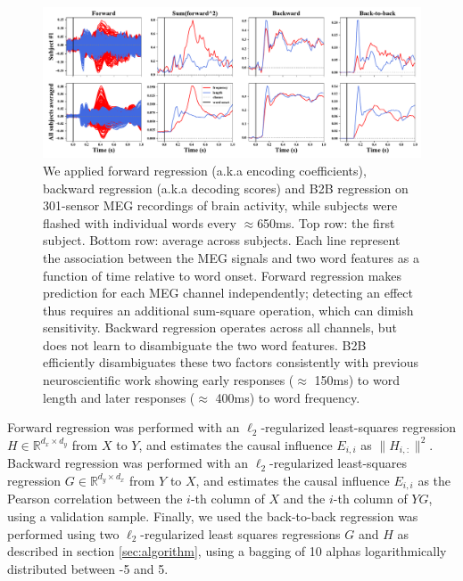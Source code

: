 \begin{figure}[t!]
  \centering
  \includegraphics[width=\textwidth, trim=0cm 0cm 0cm 0cm, clip=True]{figures/meg_twocurves.pdf}
  \caption{We applied forward regression (a.k.a encoding coefficients), backward regression (a.k.a decoding scores) and B2B regression on 301-sensor MEG recordings of brain activity, while subjects were flashed with individual words every $\approx$650ms. Top row: the first subject. Bottom row: average across subjects. Each line represent the association between the MEG signals and two word features as a function of time relative to word onset. Forward regression makes prediction for each MEG channel independently; detecting an effect thus requires an additional sum-square operation, which can dimish sensitivity. Backward regression operates across all channels, but does not learn to disambiguate the two word features. B2B efficiently disambiguates these two factors consistently with previous neuroscientific work \cite{kutas2011thirty}\citep{pegado2014timing}
  showing early responses ($\approx$ 150ms) to word length and later responses
  ($\approx$ 400ms) to word frequency.}
  \label{fig:meg_twocurves}
\end{figure}

Forward regression was performed with an $\ell_2$-regularized least-squares regression $H \in \mathbb{R}^{d_x \times d_y}$ from $X$ to $Y$, and estimates the causal influence $E_{i,i}$ as $\| H_{i, :} \|^2$.
%
Backward regression was performed with an $\ell_2$-regularized least-squares regression $G \in \mathbb{R}^{d_y \times d_x}$ from $Y$ to $X$, and estimates the causal influence $E_{i, i}$ as the Pearson correlation between the $i$-th column of $X$ and the $i$-th column of $YG$, using a validation sample.
%
Finally, we used the back-to-back regression was performed using two $\ell_2$-regularized
least squares regressions $G$ and $H$ as described in section \ref{sec:algorithm}, using a bagging of 10 alphas logarithmically distributed between -5 and 5.

